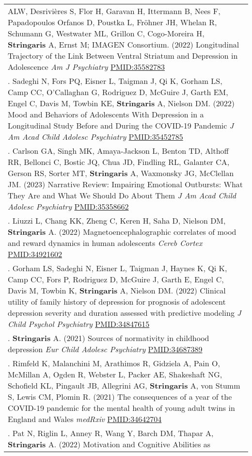 \documentclass[
]{article}
\begin{document}
\begin{longtable}[]{@{}
  >{\raggedright\arraybackslash}p{}@{}}
ALW, Desrivières S, Flor H, Garavan H, Ittermann B, Nees F, Papadopoulos
Orfanos D, Poustka L, Fröhner JH, Whelan R, Schumann G, Westwater ML,
Grillon C, Cogo-Moreira H, \textbf{Stringaris} A, Ernst M; IMAGEN
Consortium. (2022) Longitudinal Trajectory of the Link Between Ventral
Striatum and Depression in Adolescence \emph{Am J Psychiatry}
\url{PMID:35582783} \\
39. Sadeghi N, Fors PQ, Eisner L, Taigman J, Qi K, Gorham LS, Camp CC,
O'Callaghan G, Rodriguez D, McGuire J, Garth EM, Engel C, Davis M,
Towbin KE, \textbf{Stringaris} A, Nielson DM. (2022) Mood and Behaviors
of Adolescents With Depression in a Longitudinal Study Before and During
the COVID-19 Pandemic \emph{J Am Acad Child Adolesc Psychiatry}
\url{PMID:35452785} \\
40. Carlson GA, Singh MK, Amaya-Jackson L, Benton TD, Althoff RR,
Bellonci C, Bostic JQ, Chua JD, Findling RL, Galanter CA, Gerson RS,
Sorter MT, \textbf{Stringaris} A, Waxmonsky JG, McClellan JM. (2023)
Narrative Review: Impairing Emotional Outbursts: What They Are and What
We Should Do About Them \emph{J Am Acad Child Adolesc Psychiatry}
\url{PMID:35358662} \\
41. Liuzzi L, Chang KK, Zheng C, Keren H, Saha D, Nielson DM,
\textbf{Stringaris} A. (2022) Magnetoencephalographic correlates of mood
and reward dynamics in human adolescents \emph{Cereb Cortex}
\url{PMID:34921602} \\
42. Gorham LS, Sadeghi N, Eisner L, Taigman J, Haynes K, Qi K, Camp CC,
Fors P, Rodriguez D, McGuire J, Garth E, Engel C, Davis M, Towbin K,
\textbf{Stringaris} A, Nielson DM. (2022) Clinical utility of family
history of depression for prognosis of adolescent depression severity
and duration assessed with predictive modeling \emph{J Child Psychol
Psychiatry} \url{PMID:34847615} \\
43. \textbf{Stringaris} A. (2021) Sources of normativity in childhood
depression \emph{Eur Child Adolesc Psychiatry} \url{PMID:34687389} \\
44. Rimfeld K, Malanchini M, Arathimos R, Gidziela A, Pain O, McMillan
A, Ogden R, Webster L, Packer AE, Shakeshaft NG, Schofield KL, Pingault
JB, Allegrini AG, \textbf{Stringaris} A, von Stumm S, Lewis CM, Plomin
R. (2021) The consequences of a year of the COVID-19 pandemic for the
mental health of young adult twins in England and Wales \emph{medRxiv}
\url{PMID:34642704} \\
45. Pat N, Riglin L, Anney R, Wang Y, Barch DM, Thapar A,
\textbf{Stringaris} A. (2022) Motivation and Cognitive Abilities as

\end{longtable}
\end{document}
